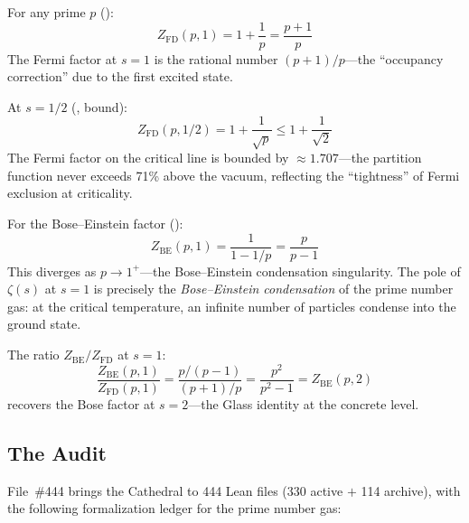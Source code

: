 \begin{observation}
For any prime $p$ ():
\begin{equation}
  Z_{\mathrm{FD}}(p, 1) = 1 + \frac{1}{p} = \frac{p+1}{p}
  \label{eq:fermi-critical}
\end{equation}
The Fermi factor at $s=1$ is the rational number $(p+1)/p$---the
``occupancy correction'' due to the first excited state.

At $s = 1/2$ (, bound):
\begin{equation}
  Z_{\mathrm{FD}}(p, 1/2) = 1 + \frac{1}{\sqrt{p}} \leq 1 + \frac{1}{\sqrt{2}}
\end{equation}
The Fermi factor on the critical line is bounded by
$\approx 1.707$---the partition function never exceeds 71\% above
the vacuum, reflecting the ``tightness'' of Fermi exclusion at
criticality.
\end{observation}

\begin{observation}
For the Bose--Einstein factor ():
\begin{equation}
  Z_{\mathrm{BE}}(p, 1) = \frac{1}{1 - 1/p} = \frac{p}{p-1}
  \label{eq:bose-critical}
\end{equation}
This diverges as $p \to 1^+$---the Bose--Einstein condensation
singularity. The pole of $\zeta(s)$ at $s = 1$ is precisely the
\emph{Bose--Einstein condensation} of the prime number gas: at the
critical temperature, an infinite number of particles condense into
the ground state.

The ratio $Z_{\mathrm{BE}}/Z_{\mathrm{FD}}$ at $s = 1$:
\[
  \frac{Z_{\mathrm{BE}}(p, 1)}{Z_{\mathrm{FD}}(p, 1)}
  = \frac{p/(p-1)}{(p+1)/p}
  = \frac{p^2}{p^2 - 1}
  = Z_{\mathrm{BE}}(p, 2)
\]
recovers the Bose factor at $s = 2$---the Glass identity at the
concrete level.
\end{observation}

\subsection{The Audit}

File~\#444 brings the Cathedral to 444 Lean files
(330 active $+$ 114 archive), with the following formalization ledger
for the prime number gas:

